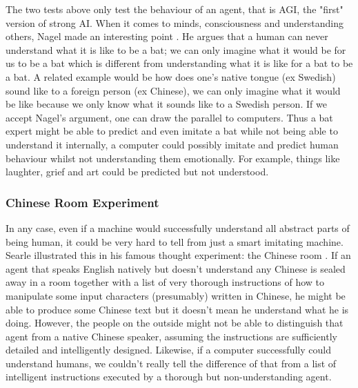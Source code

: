 \documentclass[11pt]{article}
\newenvironment{draft}{\color{dark-cornflower-blue-2}}{\ignorespacesafterend}
\begin{document}
\begin{draft}
The two tests above only test the behaviour of an agent, that is AGI, the "first" version of strong AI. When it comes to minds, consciousness and understanding others, Nagel made an interesting point \cite{nagel1974like}. He argues that a human can never understand what it is like to be a bat; we can only imagine what it would be for us to be a bat which is different from understanding what it is like for a bat to be a bat. A related example would be how does one’s native tongue (ex Swedish) sound like to a foreign person (ex Chinese), we can only imagine what it would be like because we only know what it sounds like to a Swedish person. If we accept Nagel's argument, one can draw the parallel to computers. Thus a bat expert might be able to predict and even imitate a bat while not being able to understand it internally, a computer could possibly imitate and predict human behaviour whilst not understanding them emotionally. For example, things like laughter, grief and art could be predicted but not understood.

\subsubsection*{Chinese Room Experiment}
\label{sec:chinese_room}

In any case, even if a machine would successfully understand all abstract parts of being human, it could be very hard to tell from just a smart imitating machine. Searle illustrated this in his famous thought experiment: the Chinese room \cite{searle1980minds} . If an agent that speaks English natively but doesn't understand any Chinese is sealed away in a room together with a list of very thorough instructions of how to manipulate some input characters (presumably) written in Chinese, he might be able to produce some Chinese text but it doesn't mean he understand what he is doing. However, the people on the outside might not be able to distinguish that agent from a native Chinese speaker, assuming the instructions are sufficiently detailed and intelligently designed. Likewise, if a computer successfully could understand humans, we couldn't really tell the difference of that from a list of intelligent instructions executed by a thorough but non-understanding agent.

\end{draft}
\end{document}
